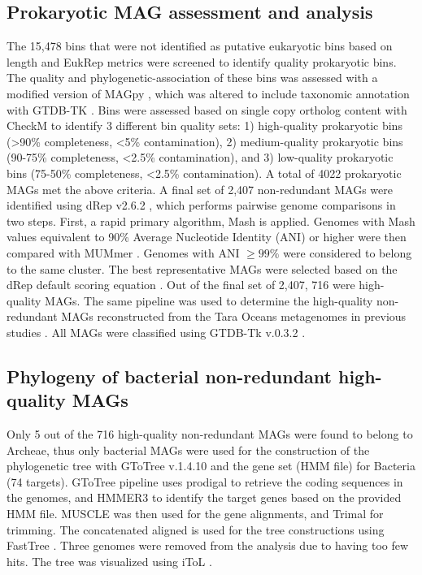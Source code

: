 \documentclass[12pt]{article}
\numberwithin{equation}{section}
\begin{document}
\subsection*{Prokaryotic MAG assessment and analysis} 
The 15,478 bins that were not identified as putative eukaryotic bins based on length and EukRep metrics were screened to identify quality prokaryotic bins. The quality and phylogenetic-association of these bins was assessed with a modified version of MAGpy \citep{Stewart2019MAGpy}, which was altered to include taxonomic annotation with GTDB-TK \citep{Stewart2019MAGpy}. Bins were assessed based on single copy ortholog content with CheckM \citep{Parks2015CheckM} to identify 3 different bin quality sets: 1) high-quality prokaryotic bins (>90\% completeness, <5\% contamination), 2) medium-quality prokaryotic bins (90-75\% completeness, <2.5\% contamination), and 3) low-quality prokaryotic bins (75-50\% completeness, <2.5\% contamination). A total of 4022 prokaryotic MAGs met the above criteria. A final set of 2,407 non-redundant MAGs were identified using dRep v2.6.2 \citep{Olm_2017}, which performs pairwise genome comparisons in two steps. First, a rapid primary algorithm, Mash \citep{Ondov_2016} is applied. Genomes with Mash values equivalent to 90\% Average Nucleotide Identity (ANI) or higher were then compared with MUMmer \citep{Mar_ais_2018}. Genomes with ANI $\geq99\%$ were considered to belong to the same cluster. The best representative MAGs were selected based on the dRep default scoring equation \citep{Olm_2017}. Out of the final set of 2,407, 716 were high-quality MAGs. The same pipeline was used to determine the high-quality non-redundant MAGs reconstructed from the Tara Oceans metagenomes in previous studies \citep{Tully2018reconstruction, Parks2017Recovery, Delmont2018Nitrogen-fixing}. All MAGs were classified using GTDB-Tk v.0.3.2 \citep{Chaumeil_2019}.

\subsection*{Phylogeny of bacterial non-redundant high-quality MAGs}
Only 5 out of the 716 high-quality non-redundant MAGs were found to belong to Archeae, thus only bacterial MAGs were used for the construction of the phylogenetic tree with GToTree v.1.4.10 \citep{Lee_2019} and the gene set (HMM file) for Bacteria (74 targets). GToTree pipeline uses prodigal \citep{Hyatt_2010} to retrieve the coding sequences in the genomes, and HMMER3 \citep{Eddy_2011} to identify the target genes based on the provided HMM file. MUSCLE \citep{Edgar_2004} was then used for the gene alignments, and Trimal \citep{Capella_Gutierrez_2009} for trimming. The concatenated aligned is used for the tree constructions using FastTree . Three genomes were removed from the analysis due to having too few hits. The tree was visualized using iToL \citep{Letunic2016Interactive}.
\end{document}
